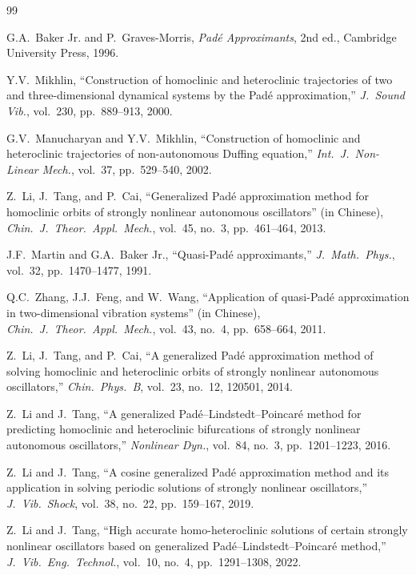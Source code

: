 \documentclass[11pt,a4paper]{article}
\begin{document}
\begin{thebibliography}{99}

 G.A.\ Baker Jr. and P.\ Graves-Morris, \emph{Pad\'e Approximants}, 2nd ed., Cambridge University Press, 1996.

 Y.V.\ Mikhlin, ``Construction of homoclinic and heteroclinic trajectories of two and three-dimensional dynamical systems by the Pad\'e approximation,'' \emph{J.\ Sound Vib.}, vol.\ 230, pp.\ 889--913, 2000.

 G.V.\ Manucharyan and Y.V.\ Mikhlin, ``Construction of homoclinic and heteroclinic trajectories of non-autonomous Duffing equation,'' \emph{Int.\ J.\ Non-Linear Mech.}, vol.\ 37, pp.\ 529--540, 2002.

 Z.\ Li, J.\ Tang, and P.\ Cai, ``Generalized Pad\'e approximation method for homoclinic orbits of strongly nonlinear autonomous oscillators'' (in Chinese), \emph{Chin.\ J.\ Theor.\ Appl.\ Mech.}, vol.\ 45, no.\ 3, pp.\ 461--464, 2013.

 J.F.\ Martin and G.A.\ Baker Jr., ``Quasi-Pad\'e approximants,'' \emph{J.\ Math.\ Phys.}, vol.\ 32, pp.\ 1470--1477, 1991.

 Q.C.\ Zhang, J.J.\ Feng, and W.\ Wang, ``Application of quasi-Pad\'e approximation in two-dimensional vibration systems'' (in Chinese), \emph{Chin.\ J.\ Theor.\ Appl.\ Mech.}, vol.\ 43, no.\ 4, pp.\ 658--664, 2011.

 Z.\ Li, J.\ Tang, and P.\ Cai, ``A generalized Pad\'e approximation method of solving homoclinic and heteroclinic orbits of strongly nonlinear autonomous oscillators,'' \emph{Chin.\ Phys.\ B}, vol.\ 23, no.\ 12, 120501, 2014.

 Z.\ Li and J.\ Tang, ``A generalized Pad\'e--Lindstedt--Poincar\'e method for predicting homoclinic and heteroclinic bifurcations of strongly nonlinear autonomous oscillators,'' \emph{Nonlinear Dyn.}, vol.\ 84, no.\ 3, pp.\ 1201--1223, 2016.

 Z.\ Li and J.\ Tang, ``A cosine generalized Pad\'e approximation method and its application in solving periodic solutions of strongly nonlinear oscillators,'' \emph{J.\ Vib.\ Shock}, vol.\ 38, no.\ 22, pp.\ 159--167, 2019.

 Z.\ Li and J.\ Tang, ``High accurate homo-heteroclinic solutions of certain strongly nonlinear oscillators based on generalized Pad\'e--Lindstedt--Poincar\'e method,'' \emph{J.\ Vib.\ Eng.\ Technol.}, vol.\ 10, no.\ 4, pp.\ 1291--1308, 2022.

\end{thebibliography}
\end{document}
